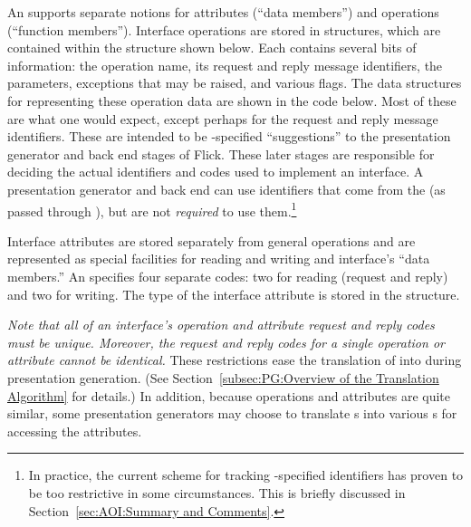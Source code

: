 An  supports separate notions for attributes (``data
members'') and operations (``function members'').  Interface operations are
stored in  structures, which are contained within the
 structure shown below.  Each  contains
several bits of information: the operation name, its request and reply message
identifiers, the parameters, exceptions that may be raised, and various flags.
The \AOI{} data structures for representing these operation data are shown in
the code below.  Most of these are what one would expect, except perhaps for
the request and reply message identifiers.  These are intended to be
\IDL{}-specified ``suggestions'' to the presentation generator and back end
stages of Flick.  These later stages are responsible for deciding the actual
identifiers and codes used to implement an interface.  A presentation generator
and back end can use identifiers that come from the \IDL{} (as passed through
\AOI{}), but are not \emph{required} to use them.\footnote{In practice, the
current scheme for tracking \IDL{}-specified identifiers has proven to be too
restrictive in some circumstances.  This is briefly discussed in
Section~\ref{sec:AOI:Summary and Comments}.}

Interface attributes are stored separately from general operations and are
represented as special facilities for reading and writing and interface's
``data members.''  An  specifies four separate codes: two
for reading (request and reply) and two for writing.  The type of the interface
attribute is stored in the  structure.

\emph{Note that all of an interface's operation and attribute request and reply
codes must be unique.  Moreover, the request and reply codes for a single
operation or attribute cannot be identical.}  These restrictions ease the
translation of \AOI{} into \MINT{} during presentation generation.  (See
Section~\ref{subsec:PG:Overview of the Translation Algorithm} for details.)  In
addition, because operations and attributes are quite similar, some
presentation generators may choose to translate s into
various s for accessing the attributes.

